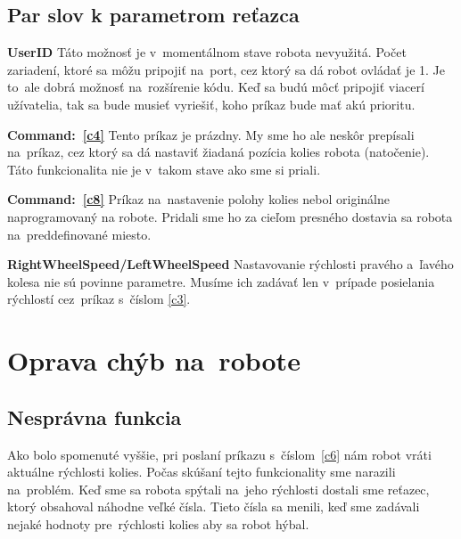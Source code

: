 \subsection{Par slov k parametrom reťazca}

\noindent \textbf{UserID} \newline
\indent Táto možnosť je v~momentálnom stave robota nevyužitá. Počet zariadení, ktoré sa môžu pripojiť na~port, cez ktorý sa dá robot ovládať
je 1. Je to~ale dobrá možnosť na~rozšírenie kódu. Keď sa budú môcť pripojiť viacerí užívatelia, tak sa bude musieť vyriešiť, koho príkaz
bude mať akú prioritu. \newline

\noindent \textbf{Command:~\ref{c4}} \newline
\indent Tento príkaz je prázdny. My sme ho ale neskôr prepísali na~príkaz, cez ktorý sa dá nastaviť žiadaná pozícia kolies robota (natočenie).
Táto funkcionalita nie je v~takom stave ako sme si priali. \newline

\noindent \textbf{Command:~\ref{c8}} \newline
\indent Príkaz na~nastavenie polohy kolies nebol originálne naprogramovaný na robote. Pridali sme ho za cieľom presného dostavia sa robota
na~preddefinované miesto. \newline

\noindent \textbf{RightWheelSpeed/LeftWheelSpeed} \newline
\indent Nastavovanie rýchlosti pravého a~ľavého kolesa nie sú povinne parametre. Musíme ich zadávať len v~prípade posielania rýchlostí
cez~príkaz s~číslom \ref{c3}.

\section{Oprava chýb na~robote}

\subsection{Nesprávna funkcia}

Ako bolo spomenuté vyššie, pri poslaní príkazu s~číslom~\ref{c6} nám robot vráti aktuálne rýchlosti kolies. Počas skúšaní tejto funkcionality
sme narazili na~problém. Keď sme sa robota spýtali na~jeho rýchlosti dostali sme reťazec, ktorý obsahoval náhodne veľké čísla. Tieto čísla sa
menili, keď sme zadávali nejaké hodnoty pre~rýchlosti kolies aby sa robot hýbal.

